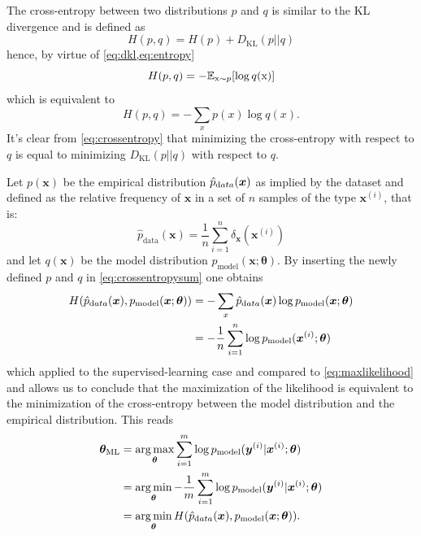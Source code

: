 The cross-entropy between two distributions $p$ and $q$ is similar to the KL divergence and is defined as
\begin{equation}  \label{eq:crossentropy}
    H(p,q) = H(p) + D_{\text{KL}}(p||q)
\end{equation}
hence, by virtue of \cref{eq:dkl,eq:entropy}
\begin{equation}
    H(p,q) = -\mathbb{E}_{\text x\sim p}[\log q(\text x)]
\end{equation}
which is equivalent to
\begin{equation} \label{eq:crossentropysum}
    H(p,q) = - \sum_x p(x) \log q(x).
\end{equation}
It's clear from \cref{eq:crossentropy} that minimizing the cross-entropy with respect to $q$ is equal to minimizing $D_{\text{KL}}(p||q)$ with respect to $q$.

Let $p(\bm{x})$ be the empirical distribution $\hat{p}_{\text data}(\bm{x})$ as implied by the dataset and defined as the relative frequency of $\bm{x}$ in a set of $n$ samples of the type $\bm{x}^{(i)}$, that is:
\begin{equation}
    \hat{p}_{\text{data}}(\bm{x}) = \dfrac{1}{n} \sum_{i=1}^{n} \delta_{\bm{x}}(\bm{x}^{(i)})
\end{equation}
and let $q(\bm{x})$ be the model distribution $p_{\text{model}}(\bm{x};\bm{\theta})$.
By inserting the newly defined $p$ and $q$ in \cref{eq:crossentropysum} one obtains
\begin{align}
    H(\hat{p}_{\text data}(\bm{x}), p_{\text{model}}(\bm{x};\bm{\theta})) & =  - \sum_x \hat{p}_{\text data}(\bm{x}) \log p_{\text{model}}(\bm{x};\bm{\theta}) \\ & = - \dfrac{1}{n} \sum_{i=1}^{n} \log p_{\text{model}}(\bm{x}^{(i)};\bm{\theta})
\end{align}
which applied to the supervised-learning case and compared to \cref{eq:maxlikelihood} and allows us to conclude that the maximization of the likelihood is equivalent to the minimization of the cross-entropy between the model distribution and the empirical distribution. This reads
\begin{align}
    \bm{\theta}_{\text{ML}} & = \operatorname*{\arg\max}_{\bm{\theta}} \sum_{i=1}^m \log p_{\text{model}}(\bm{y}^{(i)}|\bm{x}^{(i)}; \bm{\theta}) \\
    & = \operatorname*{\arg\min}_{\bm{\theta}} - \dfrac{1}{m} \sum_{i=1}^m \log p_{\text{model}}(\bm{y}^{(i)}|\bm{x}^{(i)}; \bm{\theta}) \\
    & = \operatorname*{\arg\min}_{\bm{\theta}} H(\hat{p}_{\text data}(\bm{x}), p_{\text{model}}(\bm{x};\bm{\theta})).
\end{align}

